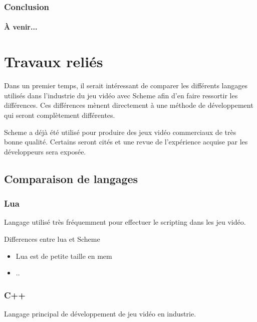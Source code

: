 \documentclass[12pt,oneside,letterpaper,francais]{book}
\begin{document}
\subsection{Conclusion}
\subsubsection{À venir...}




\chapter{Travaux reliés}

Dans un premier temps, il serait intéressant de comparer les
différents langages utilisés dans l'industrie du jeu vidéo avec Scheme
afin d'en faire ressortir les différences. Ces différences mènent
directement à une méthode de développement qui seront complètement
différentes.

Scheme a déjà été utilisé pour produire des jeux vidéo commerciaux de
très bonne qualité. Certains seront cités et une revue de l'expérience
acquise par les développeurs sera exposée.

\section{Comparaison de langages}

\subsection{Lua}
Langage utilisé très fréquemment pour effectuer le \og scripting \fg
dans les jeu vidéo.

Differences entre lua et Scheme
\begin{itemize}
\item Lua est de petite taille en mem
\item ..
\end{itemize}

\subsection{C++}
Langage principal de développement de jeu vidéo en industrie.
\end{document}
